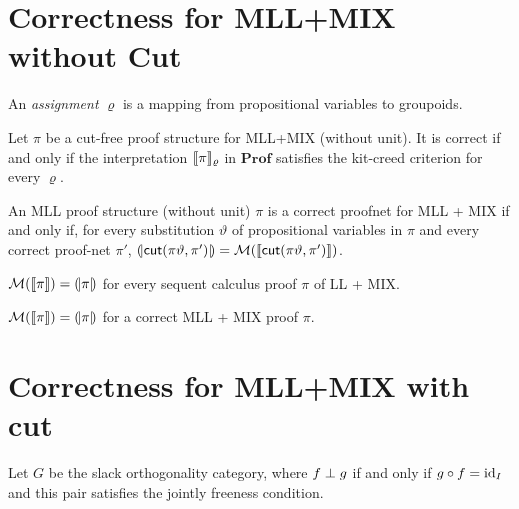 \section{Correctness for \textsf{MLL+MIX} without Cut}


An \emph{assignment} \( \varrho \) is a mapping from propositional variables to groupoids.

\begin{theorem}
    Let \( \pi \) be a cut-free proof structure for \textsf{MLL+MIX} (without unit).
    It is correct if and only if the interpretation \( \llbracket{\pi}\rrbracket_\varrho \) in \( \mathbf{Prof} \) satisfies the kit-creed criterion for every \( \varrho \).
\end{theorem}


\begin{theorem}
    An MLL proof structure (without unit) \( \pi \) is a correct proofnet for MLL + MIX if and only if, for every substitution \( \vartheta \) of propositional variables in \( \pi \) and every correct proof-net \( \pi' \), \( (\!|{\mathsf{cut}(\pi\vartheta, \pi')}|\!) = \mathcal{M}({\llbracket{\mathsf{cut}(\pi\vartheta, \pi')}\rrbracket}) \). 
\end{theorem}


\begin{corollary}
    \( \mathcal{M}({\llbracket{\pi}\rrbracket}) = (\!|{\pi}|\!) \) for every sequent calculus proof \( \pi \) of LL + MIX.
\end{corollary}
\begin{corollary}
    \( \mathcal{M}({\llbracket{\pi}\rrbracket}) = (\!|{\pi}|\!) \) for a correct MLL + MIX proof \( \pi \). 
\end{corollary}



\section{Correctness for \textsf{MLL+MIX} with \textsf{cut}}
Let \( G \) be the slack orthogonality category, where \( f \mathrel{\bot} g \) if and only if \( g \circ f = \mathrm{id}_I \) and this pair satisfies the jointly freeness condition.

